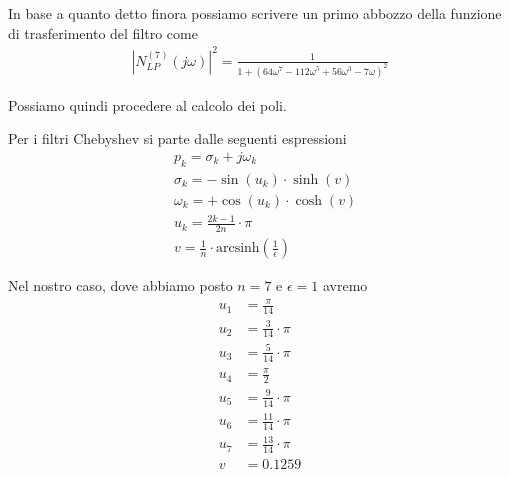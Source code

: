 \documentclass[a4paper,12pt]{report}
\begin{document}
In base a quanto detto finora possiamo scrivere un primo abbozzo della funzione di trasferimento del filtro come
\begin{align}
|N^{(7)}_{LP}(j\omega)|^2 = \frac{1}{1 + (64\omega^7 - 112\omega^5 + 56\omega^3 -7\omega)^2}
\end{align}

Possiamo quindi procedere al calcolo dei poli.

Per i filtri Chebyshev si parte dalle seguenti espressioni
\begin{align}
&p_k = \sigma_k + j\omega_k \\
&\sigma_k = - \sin(u_k) \cdot \sinh (v)\\
&\omega_k = + \cos(u_k) \cdot \cosh (v)\\
&u_k = \frac{2k-1}{2n} \cdot \pi\\
&v = \frac{1}{n} \cdot \text{arcsinh} \left( \frac{1}{\epsilon} \right) \label{epsilon}
\end{align}

Nel nostro caso, dove abbiamo posto $n=7$ e $\epsilon =1$ avremo
\begin{align}
u_1 &= \frac{\pi}{14} \\
u_2 &= \frac{3}{14} \cdot \pi \\
u_3 &= \frac{5}{14} \cdot \pi\\
u_4 &= \frac{\pi}{2}\\
u_5 &= \frac{9}{14} \cdot \pi\\
u_6 &= \frac{11}{14} \cdot \pi\\
u_7 &= \frac{13}{14} \cdot \pi\\
v &= 0.1259
\end{align}
\end{document}
